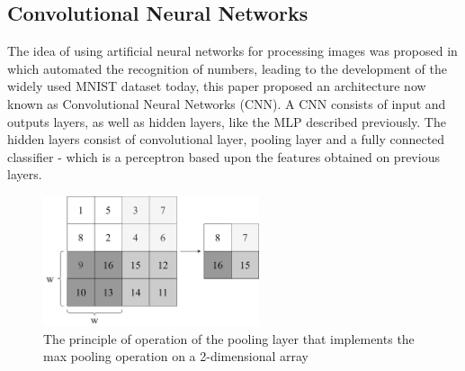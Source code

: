 \documentclass[journal]{IEEEtran}
\begin{document}
\subsection{Convolutional Neural Networks}
The idea of using artificial neural networks for processing images was proposed in \cite{lecun1998a} which automated the recognition of numbers, leading to the development of the widely used MNIST dataset today, this paper proposed an architecture now known as Convolutional Neural Networks (CNN). A CNN consists of input and outputs layers, as well as hidden layers, like the MLP described previously. The hidden layers consist of convolutional layer, pooling layer and a fully connected classifier - which is a perceptron based upon the features obtained on previous layers. 

\begin{figure}[!t]
    \centering
    \includegraphics[width=2.5in]{assets/CNN_pooling_layer.png}
    
    \caption{The principle of operation of the pooling layer that implements the max pooling operation on a 2-dimensional array}
    \label{fig:cnn-pooling}
    
\end{figure}
\end{document}
